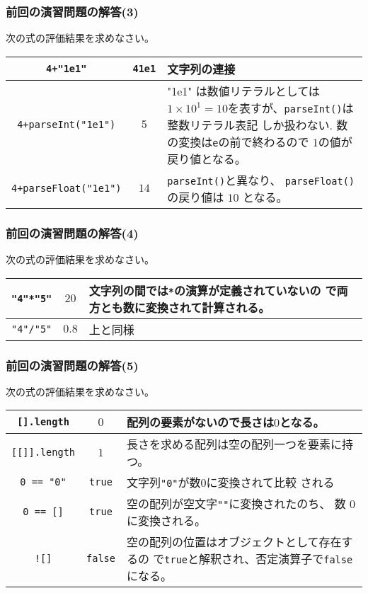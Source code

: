 \begin{frame}[containsverbatim]
\frametitle{前回の演習問題の解答(3)}
次の式の評価結果を求めなさい。
\begin{center}
 \begin{tabular}{|>{\Rule}c|c|m{}|}\hline
  \Verb-4+"1e1"-& \Verb+41e1+ & 文字列の連接\\\hline
  \Verb-4+parseInt("1e1")-& $5$ & "1e1" は数値リテラルとしては
    $1\times10^1=10$を表すが、\Verb+parseInt()+は整数リテラル表記
          しか扱わない.
          数の変換は\Verb+e+の前で終わるので $1$の値が
    戻り値となる。 \\ \hline
  \Verb-4+parseFloat("1e1")-& $14$& \Verb+parseInt()+と異なり、
    \Verb+parseFloat()+の戻り値は $10$ となる。\\ \hline
 \end{tabular}
\end{center}
\end{frame}
\begin{frame}[containsverbatim]
\frametitle{前回の演習問題の解答(4)}
次の式の評価結果を求めなさい。
\begin{center}
 \begin{tabular}{|>{\Rule}c|c|m{}|}\hline
  \Verb+"4"*"5"+& $20$& 文字列の間では\Verb+*+の演算が定義されていないの
    で両方とも数に変換されて計算される。\\ \hline
  \Verb+"4"/"5"+& $0.8$& 上と同様\\ \hline
 \end{tabular}
\end{center}
\end{frame}
\begin{frame}[containsverbatim]
\frametitle{前回の演習問題の解答(5)}
次の式の評価結果を求めなさい。
\begin{center}
 \begin{tabular}{|>{\Rule}c|c|m{}|}\hline
  \Verb+[].length+& $0$& 配列の要素がないので長さは$0$となる。\\ \hline
  \Verb+[[]].length+&$1$ & 長さを求める配列は空の配列一つを要素に持つ。\\ \hline
  \Verb+0 == "0"+& \Verb+true+& 文字列\Verb+"0"+が数$0$に変換されて比較
    される\\ \hline
  \Verb+0 == []+& \Verb+true+& 空の配列が空文字\texttt{""}に変換されたのち、
    数 $0$ に変換される。\\ \hline
  \Verb+![]+& \Verb+false+& 空の配列の位置はオブジェクトとして存在するの
          で\texttt{true}と解釈され、否定演算子で\texttt{false}になる。
          \\ \hline
 \end{tabular}
\end{center}
\end{frame}
